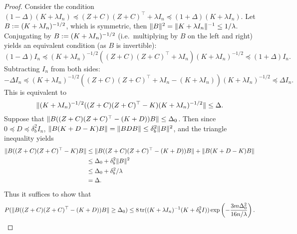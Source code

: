 \begin{proof}
  Consider the condition $(1 - \Delta)(K + \lambda I_n) \preceq (Z + C) (Z + C)^\top + \lambda I_n \preceq (1 +
  \Delta)(K + \lambda I_n)$.
  Let $B := (K + \lambda I_n)^{-1/2}$, which is symmetric, then $\|B\|^2 =
  \|K + \lambda I_n\|^{-1} \leq 1/\lambda$.
  Conjugating by $B := (K + \lambda I_n)^{-1/2}$ (i.e.\ multiplying by $B$ on the
  left and right) yields an equivalent condition (as $B$ is
  invertible):
  \begin{equation*}
    (1 - \Delta) I_n \preceq (K + \lambda I_n)^{-1/2} ((Z + C) (Z + C)^\top + \lambda I_n) (K + \lambda I_n)^{-1/2} \preceq (1 +
    \Delta) I_n.
  \end{equation*}
  Subtracting $I_n$ from both sides:
  \begin{equation*}
    -\Delta I_n \preceq (K + \lambda I_n)^{-1/2} ((Z + C) (Z + C)^\top + \lambda I_n - (K + \lambda I_n)) (K + \lambda
    I_n)^{-1/2} \preceq \Delta I_n.
  \end{equation*}
  This is equivalent to
  \begin{equation*}
    \|(K + \lambda I_n)^{-1/2} ((Z + C) (Z + C)^\top - K) (K + \lambda I_n)^{-1/2}\| \leq \Delta.
  \end{equation*}
  Suppose that $\|B((Z + C)(Z + C)^\top - (K + D))B\| \leq \Delta_0$.
  Then since $0 \preceq D \preceq \delta^2_b I_n$, $\|B(K + D - K) B\| = \|B D B\| \leq \delta^2_b
  \|B\|^2$, and the triangle inequality yields
  \begin{align*}
    \|B((Z + C)(Z + C)^\top - K)B\|
    &\leq \|B((Z + C)(Z + C)^\top - (K + D))B\| + \|B (K + D - K)B\| \\
    &\leq \Delta_0 + \delta^2_b \|B\|^2 \\
    &\leq \Delta_0 + \delta^2_b/\lambda \\
    &= \Delta.
  \end{align*}
  Thus it suffices to show that
  \begin{equation*}
    P(\|B((Z + C)(Z + C)^\top - (K + D))B\| \geq \Delta_0) \leq 8 \mathop{\rm tr}((K + \lambda I_n)^{-1} (K +
    \delta^2_b I)) \exp \left( -\frac{3m \Delta_0^2}{16n/\lambda} \right).
  \end{equation*}


\end{proof}
